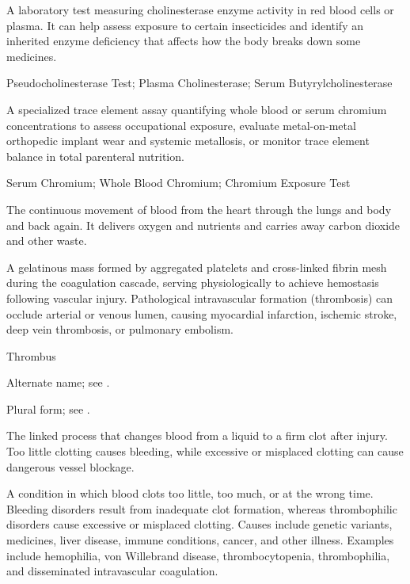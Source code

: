  A laboratory test measuring cholinesterase enzyme activity in red blood cells or plasma. It can help assess exposure to certain insecticides and identify an inherited enzyme deficiency that affects how the body breaks down some medicines.

\synonyms
Pseudocholinesterase Test; Plasma Cholinesterase; Serum Butyrylcholinesterase

 A specialized trace element assay quantifying whole blood or serum chromium concentrations to assess occupational exposure, evaluate metal-on-metal orthopedic implant wear and systemic metallosis, or monitor trace element balance in total parenteral nutrition.

\synonyms
Serum Chromium; Whole Blood Chromium; Chromium Exposure Test

 The continuous movement of blood from the heart through the lungs and body and back again. It delivers oxygen and nutrients and carries away carbon dioxide and other waste.

 A gelatinous mass formed by aggregated platelets and cross-linked fibrin mesh during the coagulation cascade, serving physiologically to achieve hemostasis following vascular injury. Pathological intravascular formation (thrombosis) can occlude arterial or venous lumen, causing myocardial infarction, ischemic stroke, deep vein thrombosis, or pulmonary embolism.

\synonyms
Thrombus

 Alternate name; see .

 Plural form; see .

 The linked process that changes blood from a liquid to a firm clot after injury. Too little clotting causes bleeding, while excessive or misplaced clotting can cause dangerous vessel blockage.

 A condition in which blood clots too little, too much, or at the wrong time. Bleeding disorders result from inadequate clot formation, whereas thrombophilic disorders cause excessive or misplaced clotting. Causes include genetic variants, medicines, liver disease, immune conditions, cancer, and other illness. Examples include hemophilia, von Willebrand disease, thrombocytopenia, thrombophilia, and disseminated intravascular coagulation.

